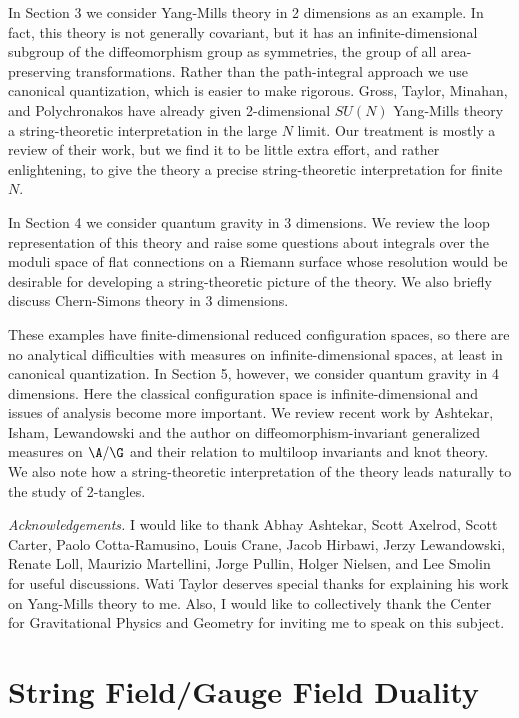 In Section 3 we consider Yang-Mills theory in 2 dimensions as an example.
In fact, this theory is not generally covariant, but it has an
infinite-dimensional subgroup of the diffeomorphism group as symmetries,
the group of all area-preserving transformations.   Rather than the
path-integral approach we use canonical quantization, which is easier to
make rigorous.   Gross, Taylor, Minahan, and Polychronakos
\cite{Gross,GT,Minahan,MP}  have already given 2-dimensional $SU(N)$
Yang-Mills theory a string-theoretic interpretation in the large $N$ limit.
Our treatment is mostly a review of their work, but we find it to be little
extra effort, and rather enlightening, to give the theory a precise
string-theoretic interpretation for finite $N$.

In Section 4 we consider quantum gravity in 3 dimensions.  We review the
loop representation of this theory and raise some questions about integrals
over the moduli space of flat connections on a Riemann surface whose
resolution would be desirable for developing a string-theoretic picture of
the theory.  We also briefly discuss Chern-Simons theory in 3 dimensions.

These examples have finite-dimensional reduced configuration spaces, so
there are no analytical difficulties with measures on infinite-dimensional
spaces, at least in canonical quantization. In Section 5, however, we
consider quantum gravity in 4 dimensions. Here the classical configuration
space is infinite-dimensional and issues of analysis become more important.
We review recent work by Ashtekar, Isham, Lewandowski and the author
\cite{AI,AL,Baez} on diffeomorphism-invariant generalized measures on
$\A/\G$ and their relation to multiloop invariants and knot theory.  We
also note how a string-theoretic interpretation of the theory leads
naturally to the study of 2-tangles.

{\it Acknowledgements.} I would like to thank Abhay Ashtekar, Scott
Axelrod, Scott Carter, Paolo Cotta-Ramusino, Louis Crane, Jacob Hirbawi,
Jerzy Lewandowski, Renate Loll,  Maurizio Martellini, Jorge Pullin,
Holger Nielsen, and Lee Smolin for useful discussions.   Wati Taylor
deserves special thanks for explaining his work on Yang-Mills theory to me.
Also, I would like to collectively thank the Center for Gravitational
Physics and Geometry for inviting me to speak on this subject.

\section{String Field/Gauge Field Duality}

